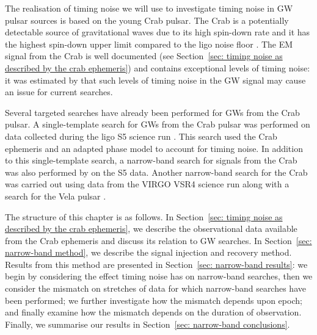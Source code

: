\documentclass[../full_thesis/full_thesis.tex]{subfiles}
\begin{document}
The realisation of timing noise we will use to investigate timing noise in GW
pulsar sources is based on the young Crab pulsar. The Crab is a potentially
detectable  source of gravitational waves due to its high spin-down rate and it
has the highest spin-down upper limit compared to the ligo noise floor
\citep{ligo2008}. The EM signal from the Crab is well documented (see
Section~\ref{sec: timing noise as described by the crab ephemeris}) and contains
exceptional levels of timing noise: it was estimated by \citet{Jones2004} that
such levels of timing noise in the GW signal may cause an issue for current
searches.

Several targeted searches have already
been performed for GWs from the Crab pulsar.
A single-template search for GWs from the Crab pulsar was performed on data
collected during the ligo S5 science run \citep{ligo2008}.  This search used
the Crab ephemeris and an adapted phase model to account for timing noise.  In
addition to this single-template search, a narrow-band search for signals from
the Crab was also performed by \citet{ligo2008} on the S5 data. Another
narrow-band search for the Crab was carried out using data from the VIRGO
VSR4 science run along with a search for the Vela pulsar \citep{ligo2015}.

The structure of this chapter is as follows. In Section~\ref{sec: timing noise
as described by the crab ephemeris}, we describe the observational data
available from the Crab ephemeris and discuss its relation to GW searches. In
Section~\ref{sec: narrow-band method}, we describe the signal injection and
recovery method.  Results from this method are presented in Section~\ref{sec:
narrow-band results}: we begin by considering the effect timing noise has on
narrow-band searches, then we consider the mismatch on stretches of data for
which narrow-band searches have been performed; we further investigate how the
mismatch depends upon epoch; and finally examine how the mismatch depends on
the duration of observation. Finally, we summarise our results in Section~\ref{sec:
narrow-band conclusions}.
\end{document}
